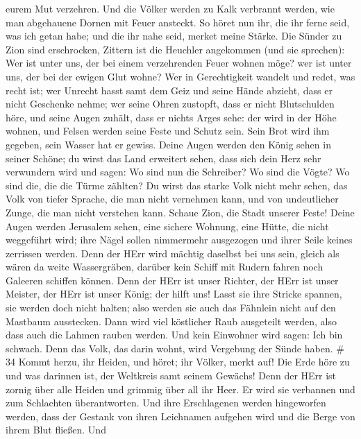 eurem Mut verzehren.  Und die Völker werden zu Kalk
verbrannt werden, wie man abgehauene Dornen mit Feuer ansteckt.
 So höret nun ihr, die ihr ferne seid, was ich getan habe;
und die ihr nahe seid, merket meine Stärke.  Die Sünder zu
Zion sind erschrocken, Zittern ist die Heuchler angekommen (und sie
sprechen): Wer ist unter uns, der bei einem verzehrenden Feuer wohnen
möge? wer ist unter uns, der bei der ewigen Glut wohne? 
Wer in Gerechtigkeit wandelt und redet, was recht ist; wer Unrecht hasst
samt dem Geiz und seine Hände abzieht, dass er nicht Geschenke nehme;
wer seine Ohren zustopft, dass er nicht Blutschulden höre, und seine
Augen zuhält, dass er nichts Arges sehe:  der wird in der
Höhe wohnen, und Felsen werden seine Feste und Schutz sein. Sein Brot
wird ihm gegeben, sein Wasser hat er gewiss.  Deine Augen
werden den König sehen in seiner Schöne; du wirst das Land erweitert
sehen,  dass sich dein Herz sehr verwundern wird und sagen:
Wo sind nun die Schreiber? Wo sind die Vögte? Wo sind die, die die Türme
zählten?  Du wirst das starke Volk nicht mehr sehen, das
Volk von tiefer Sprache, die man nicht vernehmen kann, und von
undeutlicher Zunge, die man nicht verstehen kann.  Schaue
Zion, die Stadt unserer Feste! Deine Augen werden Jerusalem sehen, eine
sichere Wohnung, eine Hütte, die nicht weggeführt wird; ihre Nägel
sollen nimmermehr ausgezogen und ihrer Seile keines zerrissen werden.
 Denn der HErr wird mächtig daselbst bei uns sein, gleich
als wären da weite Wassergräben, darüber kein Schiff mit Rudern fahren
noch Galeeren schiffen können.  Denn der HErr ist unser
Richter, der HErr ist unser Meister, der HErr ist unser König; der hilft
uns!  Lasst sie ihre Stricke spannen, sie werden doch nicht
halten; also werden sie auch das Fähnlein nicht auf den Mastbaum
ausstecken. Dann wird viel köstlicher Raub ausgeteilt werden, also dass
auch die Lahmen rauben werden.  Und kein Einwohner wird
sagen: Ich bin schwach. Denn das Volk, das darin wohnt, wird Vergebung
der Sünde haben. \# 34  Kommt herzu, ihr Heiden, und höret;
ihr Völker, merkt auf! Die Erde höre zu und was darinnen ist, der
Weltkreis samt seinem Gewächs!  Denn der HErr ist zornig
über alle Heiden und grimmig über all ihr Heer. Er wird sie verbannen
und zum Schlachten überantworten.  Und ihre Erschlagenen
werden hingeworfen werden, dass der Gestank von ihren Leichnamen
aufgehen wird und die Berge von ihrem Blut fließen.  Und
